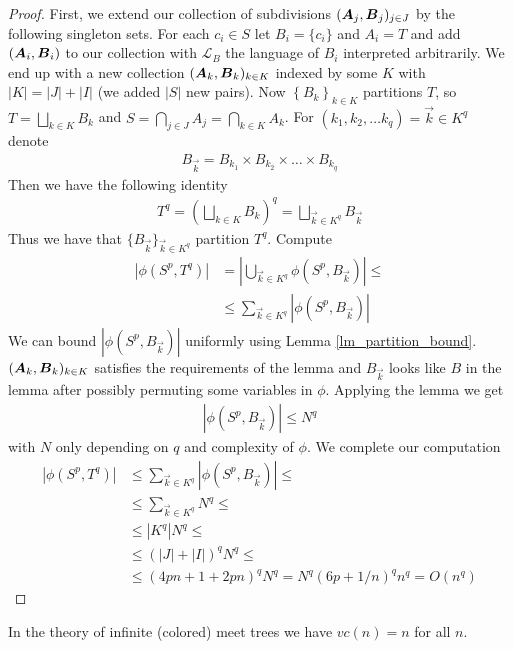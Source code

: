 \documentclass{amsart}
\DeclareMathOperator{\A}{\boldface A}
\DeclareMathOperator{\B}{\boldface B}
\renewcommand{\LL}{\mathcal L}
\newcommand{\curly}[1]{\left\{#1\right\}}
\begin{document}
\begin{proof}
  First, we extend our collection of subdivisions $(\A_j, \B_j)_{j \in J}$ by the following singleton sets. For each $c_i \in S$ let $B_i = \{c_i\}$ and $A_i = T$ and add $(\A_i, \B_i)$ to our collection with $\LL_B$ the language of $B_i$ interpreted arbitrarily. We end up with a new collection $(\A_k, \B_k)_{k \in K}$ indexed by some $K$ with $|K| = |J| + |I|$ (we added $|S|$ new pairs). Now $\curly{B_k}_{k \in K}$ partitions $T$, so $T = \bigsqcup_{k \in K} B_k$ and $S = \bigcap_{j \in J} A_j = \bigcap_{k \in K} A_k$. For $(k_1, k_2, \ldots k_q) = \vec k \in K^q$ denote 
  \begin{align*}
    B_{\vec k} = B_{k_1} \times B_{k_2} \times \ldots \times B_{k_q}
  \end{align*}
  Then we have the following identity
  \begin{align*}
    T^q = (\bigsqcup_{k \in K} B_k)^q = \bigsqcup_{\vec k \in K^q} B_{\vec k}
  \end{align*}
  Thus we have that $\{B_{\vec k}\}_{\vec k \in K^q}$ partition $T^q$. Compute
  \begin{align*}
    |\phi(S^p, T^q)|
    &= \left|\bigcup_{\vec k \in K^q} \phi(S^p, B_{\vec k}) \right| \leq \\
    &\leq \sum_{\vec k \in K^q} |\phi(S^p, B_{\vec k})|
  \end{align*}
  We can bound $|\phi(S^p, B_{\vec k})|$ uniformly using Lemma \ref{lm_partition_bound}. $(\A_k, \B_k)_{k \in K}$ satisfies the requirements of the lemma and $B_{\vec k}$ looks like $B$ in the lemma after possibly permuting some variables in $\phi$. Applying the lemma we get
  \begin{align*}
    |\phi(S^p, B_{\vec k})| \leq N^q
  \end{align*}
  with $N$ only depending on $q$ and complexity of $\phi$. We complete our computation
  \begin{align*}
    |\phi(S^p, T^q)|
    &\leq \sum_{\vec k \in K^q} |\phi(S^p, B_{\vec k})| \leq \\
    &\leq \sum_{\vec k \in K^q} N^q \leq \\
    &\leq |K^q| N^q \leq \\
    &\leq (|J| + |I|)^q N^q \leq \\
    &\leq (4pn + 1 + 2pn)^q N^q = N^q (6p + 1/n)^q n^q = O(n^q)
  \end{align*}
\end{proof}
\begin{Corollary}
  In the theory of infinite (colored) meet trees we have $vc(n) = n$ for all $n$.
\end{Corollary}
\end{document}
